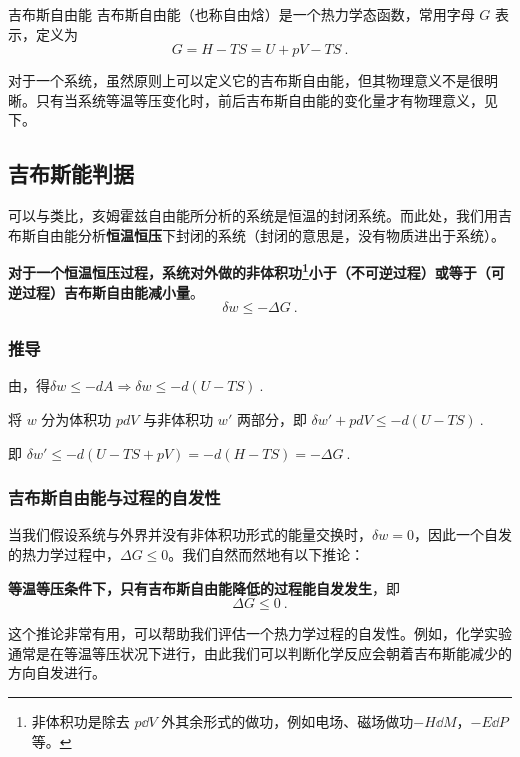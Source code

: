 
\begin{issues}
\end{issues}


\begin{definition}{吉布斯自由能}
吉布斯自由能（也称自由焓）是一个热力学态函数，常用字母 $G$ 表示，定义为
\begin{equation}
G=H-TS=U+pV-TS~.
\end{equation}
\end{definition}

对于一个系统，虽然原则上可以定义它的吉布斯自由能，但其物理意义不是很明晰。只有当系统等温等压变化时，前后吉布斯自由能的变化量才有物理意义，见下。

\subsection{吉布斯能判据}
可以与类比，亥姆霍兹自由能所分析的系统是恒温的封闭系统。而此处，我们用吉布斯自由能分析\textbf{恒温恒压}下封闭的系统（封闭的意思是，没有物质进出于系统）。

\begin{theorem}{}
\textbf{对于一个恒温恒压过程，系统对外做的非体积功\footnote{非体积功是除去 $p\dd V$ 外其余形式的做功，例如电场、磁场做功$-H\dd M$，$-E\dd P$ 等。}小于（不可逆过程）或等于（可逆过程）吉布斯自由能减小量}。
\begin{equation}
\delta w \le -\Delta G~.
\end{equation}
\end{theorem}
\subsubsection{推导}

由，得$\delta w \le -dA\Rightarrow \delta w \le -d(U-TS)~.$

将 $w$ 分为体积功 $pdV$ 与非体积功 $w'$ 两部分，即
$\delta w' + pdV \le -d(U-TS)~.$

即 $\delta w'  \le -d(U-TS+pV) = -d(H-TS) = -\Delta G~.$
\subsubsection{吉布斯自由能与过程的自发性}
当我们假设系统与外界并没有非体积功形式的能量交换时，$\delta w=0$，因此一个自发的热力学过程中，$\Delta G\le 0$。我们自然而然地有以下推论：
\begin{corollary}{}
\textbf{等温等压条件下，只有吉布斯自由能降低的过程能自发发生}，即
\begin{equation}
\Delta G \le 0~.
\end{equation}
\end{corollary}
这个推论非常有用，可以帮助我们评估一个热力学过程的自发性。例如，化学实验通常是在等温等压状况下进行，由此我们可以判断化学反应会朝着吉布斯能减少的方向自发进行。

